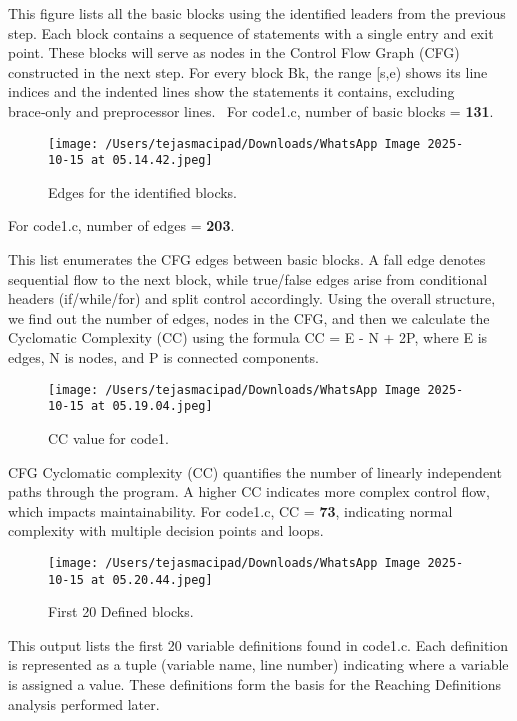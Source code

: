 \documentclass[12pt, a4paper]{report}
\begin{document}
\noindent This figure lists all the basic blocks using the identified leaders from the previous step. Each block contains a sequence of statements with a single entry and exit point. These blocks will serve as nodes in the Control Flow Graph (CFG) constructed in the next step.  For every block Bk, the range [s,e) shows its line indices and the indented lines show the statements it contains, excluding brace‑only and preprocessor lines.\
\newline
\noindent For code1.c, number of basic blocks = \textbf{131}.

\begin{figure}[H]
\centering
\texttt{[image: /Users/tejasmacipad/Downloads/WhatsApp Image 2025-10-15 at 05.14.42.jpeg]}
\caption{Edges for the identified blocks.}
\label{fig:diff-example-63}
\end{figure}

\noindent For code1.c, number of edges = \textbf{203}.

\noindent This list enumerates the CFG edges between basic blocks. A fall edge denotes sequential flow to the next block, while true/false edges arise from conditional headers (if/while/for) and split control accordingly. Using the overall structure, we find out the number of edges, nodes in the CFG, and then we calculate the Cyclomatic Complexity (CC) using the formula CC = E - N + 2P, where E is edges, N is nodes, and P is connected components.\

\begin{figure}[H]
\centering
\texttt{[image: /Users/tejasmacipad/Downloads/WhatsApp Image 2025-10-15 at 05.19.04.jpeg]}
\caption{CC value for code1.}
\label{fig:diff-example-64}
\end{figure}

\noindent CFG Cyclomatic complexity (CC) quantifies the number of linearly independent paths through the program. A higher CC indicates more complex control flow, which impacts maintainability. For code1.c, CC = \textbf{73}, indicating normal complexity with multiple decision points and loops.

\begin{figure}[H]
\centering
\texttt{[image: /Users/tejasmacipad/Downloads/WhatsApp Image 2025-10-15 at 05.20.44.jpeg]}
\caption{First 20 Defined blocks.}
\label{fig:diff-example-65}
\end{figure}

\noindent This output lists the first 20 variable definitions found in code1.c. Each definition is represented as a tuple (variable name, line number) indicating where a variable is assigned a value. These definitions form the basis for the Reaching Definitions analysis performed later.
\end{document}
